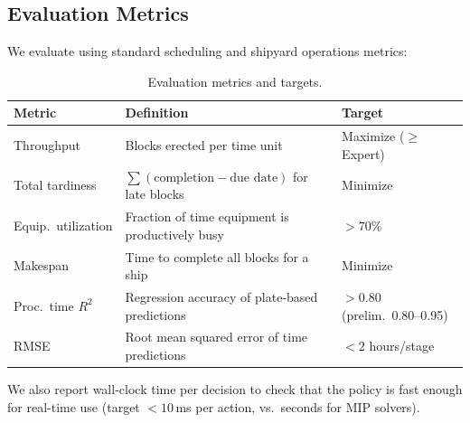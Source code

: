 \documentclass[12pt,letterpaper]{article}
\begin{document}
\subsection{Evaluation Metrics}

We evaluate using standard scheduling and shipyard operations metrics:

\begin{table}[h]
\centering
\small
\begin{tabular}{@{}p{3.2cm}p{6.5cm}p{4.2cm}@{}}
\toprule
\textbf{Metric} & \textbf{Definition} & \textbf{Target} \\
\midrule
Throughput & Blocks erected per time unit & Maximize ($\geq$ Expert) \\
Total tardiness & $\sum(\text{completion} - \text{due date})$ for late blocks & Minimize \\
Equip.\ utilization & Fraction of time equipment is productively busy & $> 70\%$ \\
Makespan & Time to complete all blocks for a ship & Minimize \\
Proc.\ time $R^2$ & Regression accuracy of plate-based predictions & $> 0.80$ (prelim.\ 0.80--0.95) \\
RMSE & Root mean squared error of time predictions & $< 2$ hours/stage \\
\bottomrule
\end{tabular}
\caption{Evaluation metrics and targets.}
\label{tab:metrics}
\end{table}

We also report wall-clock time per decision to check that the policy is fast enough for real-time use (target $< 10$\,ms per action, vs.\ seconds for MIP solvers).

\end{document}
